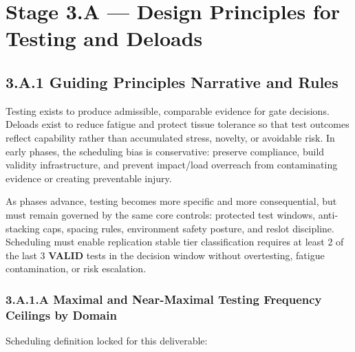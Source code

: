 \documentclass[10pt]{article}
\begin{document}
\section*{Stage 3.A — Design Principles for Testing and Deloads}
{}

\subsection*{3.A.1 Guiding Principles Narrative and Rules}
{}

Testing exists to produce admissible, comparable evidence for gate decisions. Deloads exist to reduce fatigue and protect tissue tolerance so that test outcomes reflect capability rather than accumulated stress, novelty, or avoidable risk. In early phases, the scheduling bias is conservative: preserve compliance, build validity infrastructure, and prevent impact/load overreach from contaminating evidence or creating preventable injury.

As phases advance, testing becomes more specific and more consequential, but must remain governed by the same core controls: protected test windows, anti-stacking caps, spacing rules, environment safety posture, and reslot discipline. Scheduling must enable replication stable tier classification requires at least 2 of the last 3 \textbf{VALID} tests in the decision window without overtesting, fatigue contamination, or risk escalation.

\subsubsection*{3.A.1.A Maximal and Near-Maximal Testing Frequency Ceilings by Domain}

Scheduling definition locked for this deliverable:
\end{document}
